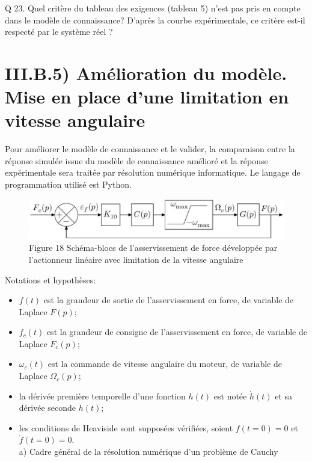 \documentclass[10pt]{article}
\begin{document}
Q 23. Quel critère du tableau des exigences (tableau 5) n'est pas pris en compte dans le modèle de connaissance? D'après la courbe expérimentale, ce critère est-il respecté par le système réel ?

\section{III.B.5) Amélioration du modèle. Mise en place d'une limitation en vitesse angulaire}
Pour améliorer le modèle de connaissance et le valider, la comparaison entre la réponse simulée issue du modèle de connaissance amélioré et la réponse expérimentale sera traitée par résolution numérique informatique. Le langage de programmation utilisé est Python.

\begin{figure}[h]
\begin{center}
  \includegraphics[width=\textwidth]{2025_09_16_5f2d7643f7e649c6833dg-13}
\captionsetup{labelformat=empty}
\caption{Figure 18 Schéma-blocs de l'asservissement de force développée par l'actionneur linéaire avec limitation de la vitesse angulaire}
\end{center}
\end{figure}

Notations et hypothèses:

\begin{itemize}
  \item $f(t)$ est la grandeur de sortie de l'asservissement en force, de variable de Laplace $F(p)$;
  \item $f_{c}(t)$ est la grandeur de consigne de l'asservissement en force, de variable de Laplace $F_{c}(p)$;
  \item $\omega_{c}(t)$ est la commande de vitesse angulaire du moteur, de variable de Laplace $\Omega_{c}(p)$;
  \item la dérivée première temporelle d'une fonction $h(t)$ est notée $\dot{h}(t)$ et sa dérivée seconde $\ddot{h}(t)$;
  \item les conditions de Heaviside sont supposées vérifiées, soient $f(t=0)=0$ et $\dot{f}(t=0)=0$.\\
a) Cadre général de la résolution numérique d'un problème de Cauchy
\end{itemize}
\end{document}
